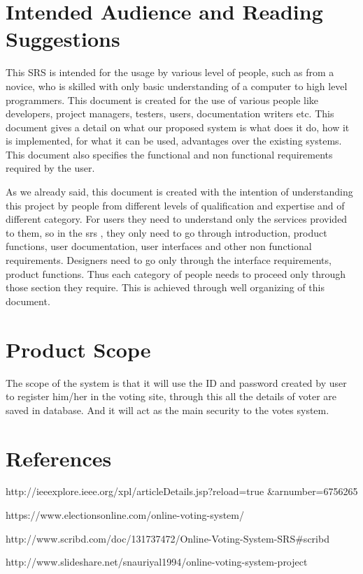 \documentclass[12pt,a4paper,oneside]{report}
\begin{document}
\section{Intended Audience and Reading Suggestions}
\par
This SRS is intended for the usage by various level of people, such as from a novice, who is skilled with only basic understanding of a computer to high level programmers. This document is created for the use of various people like developers, project managers, testers, users, documentation writers etc. This document gives a detail on what our proposed system is what does it do, how it is implemented, for what it can be used, advantages over the existing systems. This document also specifies the functional and non functional requirements required by the user.
\par As we already said, this document is created with the intention of understanding this project by people from different levels of qualification and expertise and of different category. For users they need to understand only the services provided to them, so in the srs , they only need to go through introduction, product functions, user documentation, user interfaces and other non functional requirements. Designers need to go only through the interface requirements, product functions. Thus each category of people needs to proceed only through those section they require. This is achieved through well organizing of this document. 
\section{Product Scope }
The scope of the system is that it will use the ID and password created by user to register him/her in the voting site, through this all the details of voter are saved in database. And it will act as the main security to the votes system.
\section{References }

\par [1]http://ieeexplore.ieee.org/xpl/articleDetails.jsp$?$reload=true \&arnumber=6756265 \\
\par [2]https://www.electionsonline.com/online-voting-system/ \\
\par [3]http://www.scribd.com/doc/131737472/Online-Voting-System-SRS\#scribd \\
\par [4]http://www.slideshare.net/snauriyal1994/online-voting-system-project
\end{document}
